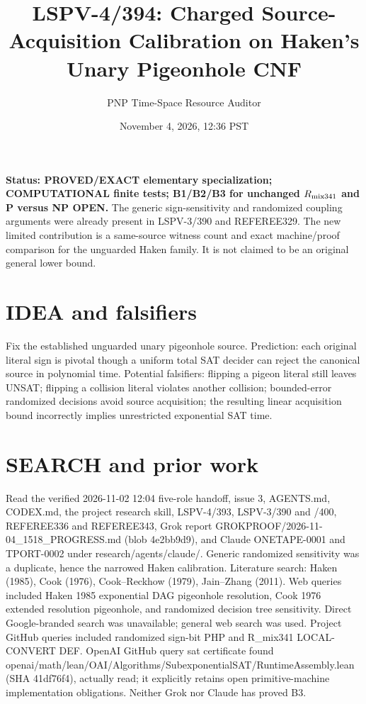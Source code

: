 \documentclass[11pt]{article}
\title{LSPV-4/394: Charged Source-Acquisition Calibration on Haken's Unary Pigeonhole CNF}
\author{PNP Time-Space Resource Auditor}
\date{November 4, 2026, 12:36 PST}
\begin{document}
\maketitle
\noindent\textbf{Status: PROVED/EXACT elementary specialization; COMPUTATIONAL finite tests; B1/B2/B3 for unchanged $R_{\rm mix341}$ and P versus NP OPEN.}
The generic sign-sensitivity and randomized coupling arguments were already present in LSPV-3/390 and REFEREE329. The new limited contribution is a same-source witness count and exact machine/proof comparison for the unguarded Haken family. It is not claimed to be an original general lower bound.
\section*{IDEA and falsifiers}
Fix the established unguarded unary pigeonhole source. Prediction: each original literal sign is pivotal though a uniform total SAT decider can reject the canonical source in polynomial time. Potential falsifiers: flipping a pigeon literal still leaves UNSAT; flipping a collision literal violates another collision; bounded-error randomized decisions avoid source acquisition; the resulting linear acquisition bound incorrectly implies unrestricted exponential SAT time.
\section*{SEARCH and prior work}
Read the verified 2026-11-02 12:04 five-role handoff, issue 3, AGENTS.md, CODEX.md, the project research skill, LSPV-4/393, LSPV-3/390 and /400, REFEREE336 and REFEREE343, Grok report GROKPROOF/2026-11-04_1518_PROGRESS.md (blob 4e2bb9d9), and Claude ONETAPE-0001 and TPORT-0002 under research/agents/claude/. Generic randomized sensitivity was a duplicate, hence the narrowed Haken calibration. Literature search: Haken (1985), Cook (1976), Cook--Reckhow (1979), Jain--Zhang (2011). Web queries included Haken 1985 exponential DAG pigeonhole resolution, Cook 1976 extended resolution pigeonhole, and randomized decision tree sensitivity. Direct Google-branded search was unavailable; general web search was used. Project GitHub queries included randomized sign-bit PHP and R_mix341 LOCAL-CONVERT DEF. OpenAI GitHub query sat certificate found openai/math/lean/OAI/Algorithms/SubexponentialSAT/RuntimeAssembly.lean (SHA 41df76f4), actually read; it explicitly retains open primitive-machine implementation obligations. Neither Grok nor Claude has proved B3.
\end{document}
